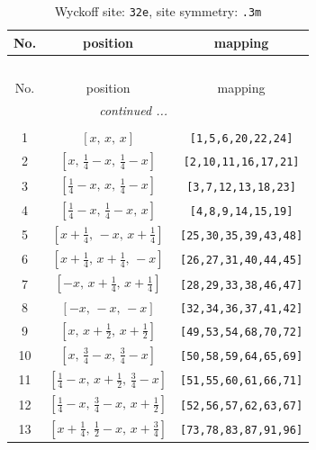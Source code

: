 \documentclass[fleqn,8pt]{jsarticle}
\begin{document}
\begin{longtable}{ccc}
\caption{Wyckoff site: {\tt 32e}, site symmetry: {\tt .3m}}
 \\
 \hline \hline
No. & position & mapping \\ \hline \endfirsthead

\multicolumn{2}{l}{\tablename\ \thetable{}} \\
 \hline \hline
No. & position & mapping \\ \hline \endhead

 \hline \hline
\multicolumn{2}{r}{\footnotesize\it continued ...} \\ \endfoot

 \hline \hline
\multicolumn{2}{r}{} \\ \endlastfoot

1 & $\left[ x,\, x,\, x \right]$ & {\tt [1,5,6,20,22,24]} \\ \hline
2 & $\left[ x,\, \frac{1}{4} - x,\, \frac{1}{4} - x \right]$ & {\tt [2,10,11,16,17,21]} \\ \hline
3 & $\left[ \frac{1}{4} - x,\, x,\, \frac{1}{4} - x \right]$ & {\tt [3,7,12,13,18,23]} \\ \hline
4 & $\left[ \frac{1}{4} - x,\, \frac{1}{4} - x,\, x \right]$ & {\tt [4,8,9,14,15,19]} \\ \hline
5 & $\left[ x + \frac{1}{4},\, - x,\, x + \frac{1}{4} \right]$ & {\tt [25,30,35,39,43,48]} \\ \hline
6 & $\left[ x + \frac{1}{4},\, x + \frac{1}{4},\, - x \right]$ & {\tt [26,27,31,40,44,45]} \\ \hline
7 & $\left[ - x,\, x + \frac{1}{4},\, x + \frac{1}{4} \right]$ & {\tt [28,29,33,38,46,47]} \\ \hline
8 & $\left[ - x,\, - x,\, - x \right]$ & {\tt [32,34,36,37,41,42]} \\ \hline
9 & $\left[ x,\, x + \frac{1}{2},\, x + \frac{1}{2} \right]$ & {\tt [49,53,54,68,70,72]} \\ \hline
10 & $\left[ x,\, \frac{3}{4} - x,\, \frac{3}{4} - x \right]$ & {\tt [50,58,59,64,65,69]} \\ \hline
11 & $\left[ \frac{1}{4} - x,\, x + \frac{1}{2},\, \frac{3}{4} - x \right]$ & {\tt [51,55,60,61,66,71]} \\ \hline
12 & $\left[ \frac{1}{4} - x,\, \frac{3}{4} - x,\, x + \frac{1}{2} \right]$ & {\tt [52,56,57,62,63,67]} \\ \hline
13 & $\left[ x + \frac{1}{4},\, \frac{1}{2} - x,\, x + \frac{3}{4} \right]$ & {\tt [73,78,83,87,91,96]} \\ \hline

\end{longtable}
\end{document}
